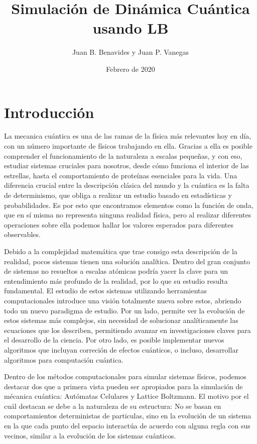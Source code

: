 \documentclass[12pts, letterpaper, twocolumn]{article}
\title{Simulación de Dinámica Cuántica usando LB}
\author{Juan B. Benavides y Juan P. Vanegas}
\date{Febrero de 2020}
\begin{document}
\maketitle
\section{Introducción}
La mecanica cuántica es una de las ramas de la física más relevantes hoy en día, con un 
número importante de físicos trabajando en ella. Gracias a ella es posible 
comprender el funcionamiento de la naturaleza a escalas pequeñas, y con eso, estudiar 
sistemas cruciales para nosotros, desde cómo funciona el interior de las estrellas, hasta 
el comportamiento de proteínas esenciales para la vida. Una diferencia crucial entre la 
descripción clásica del mundo y la cuántica es la falta de determinismo, que obliga a 
realizar un estudio basado en estadísticas y probabilidades. Es por esto que encontramos 
elementos como la función de onda, que en sí misma no representa ninguna realidad física, 
pero al realizar diferentes operaciones sobre ella podemos hallar los valores esperados 
para diferentes observables.

Debido a la complejidad matemática que trae consigo esta descripción de la realidad, pocos 
sistemas tienen una solución analítica. Dentro del gran conjunto de sistemas no resueltos 
a escalas atómicas podría yacer la clave para un entendimiento más profundo de la realidad,
por lo que su estudio resulta fundamental. El estudio de estos sistemas utilizando 
herramientas computacionales introduce una visión totalmente nueva sobre estos, abriendo 
todo un nuevo paradigma de estudio. Por un lado, permite ver la evolución de estos 
sistemas más complejos, sin necesidad de solucionar analíticamente las ecuaciones que los 
describen, permitiendo avanzar en investigaciones claves para el desarrollo de la ciencia. 
Por otro lado, es posible implementar nuevos algoritmos que incluyan correción de efectos 
cuánticos, o incluso, desarrollar algoritmos para computación cuántica.

Dentro de los métodos computacionales para simular sistemas físicos, podemos destacar dos 
que a primera vista pueden ser apropiados para la simulación de mécanica cuántica: 
Autómatas Celulares y Lattice Boltzmann. El motivo por el cuál destacan se debe a la 
naturaleza de su estructura: No se basan en comportamientos deterministas de particulas, 
sino en la evolución de un sistema en la que cada punto del espacio interactúa de acuerdo 
con alguna regla con sus vecinos, similar a la evolución de los sistemas cuánticos.
\end{document}
